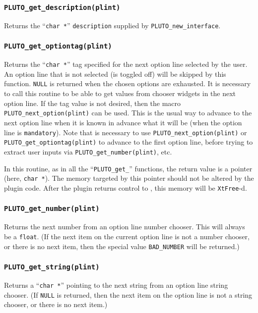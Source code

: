\subsubsection{{\tt PLUTO\_get\_description(plint)}}
  Returns the ``{\tt char~*}'' {\tt description} supplied by {\tt PLUTO\_new\_interface}.

\subsubsection{{\tt PLUTO\_get\_optiontag(plint)}}
  Returns the ``{\tt char~*}'' tag specified for the next option line selected by
  the user.  An option line that is not selected (is toggled off) will
  be skipped by this function.  {\tt NULL} is returned when the chosen
  options are exhausted.  It is necessary to call this routine to
  be able to get values from chooser widgets in the next option line.
  If the tag value is not desired, then the macro {\tt PLUTO\_next\_option(plint)}
  can be used.  This is the usual way to advance to the next option line
  when it is known in advance what it will be (when the option line is
  {\tt mandatory}).  Note that is necessary to use {\tt PLUTO\_next\_option(plint)}
  or {\tt PLUTO\_get\_optiontag(plint)} to advance to the first option
  line, before trying to extract user inputs via {\tt PLUTO\_get\_number(plint)},
  etc.

  In this routine, as in all the ``{\tt PLUTO\_get\_}'' functions, the
  return value is a pointer (here, {\tt char~*}).  The memory targeted by
  this pointer should not be altered by the plugin code.  After the plugin
  returns control to \afni, this memory will be {\tt XtFree}-d.

\subsubsection{{\tt PLUTO\_get\_number(plint)}}
  Returns the next number from an option line number chooser.  This will always be
  a {\tt float}.  (If the next item on the current option line is not a number chooser,
  or there is no next item, then the special value {\tt BAD\_NUMBER} will be returned.)

\subsubsection{{\tt PLUTO\_get\_string(plint)}}
  Returns a ``{\tt char~*}'' pointing to the next string from an option line string
 chooser.
  (If {\tt NULL} is returned,
  then the next item on the option line is not a string chooser,
  or there is no next item.)


